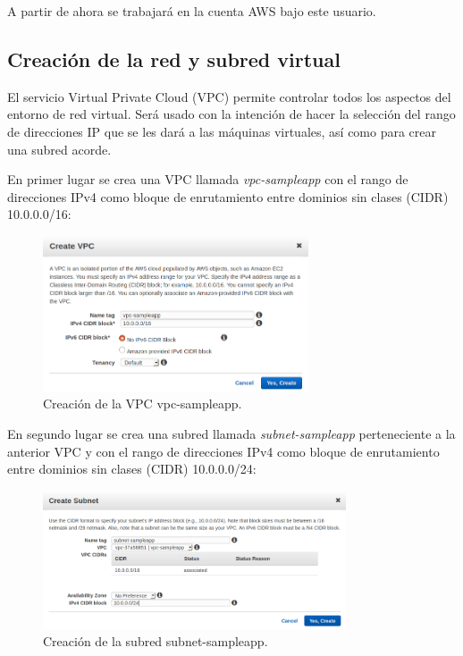 A partir de ahora se trabajará en la cuenta AWS bajo este usuario.

\subsection{Creación de la red y subred virtual}

El servicio Virtual Private Cloud (VPC) permite controlar todos los aspectos del entorno de red virtual. Será usado con la intención de hacer la selección del rango de direcciones IP que se les dará a las máquinas virtuales, así como para crear una subred acorde.

En primer lugar se crea una VPC llamada \textit{vpc-sampleapp} con el rango de direcciones IPv4 como bloque de enrutamiento entre dominios sin clases (CIDR) 10.0.0.0/16:

\begin{figure}[H]
\centering
\includegraphics[width=0.7\textwidth]{images/figures/vpc-sampleapp.png}
\caption{Creación de la VPC vpc-sampleapp.}
\end{figure}

En segundo lugar se crea una subred llamada \textit{subnet-sampleapp} perteneciente a la anterior VPC y con el rango de direcciones IPv4 como bloque de enrutamiento entre dominios sin clases (CIDR) 10.0.0.0/24:

\begin{figure}[H]
\centering
\includegraphics[width=0.8\textwidth]{images/figures/subnet-sampleapp.png}
\caption{Creación de la subred subnet-sampleapp.}
\end{figure}

